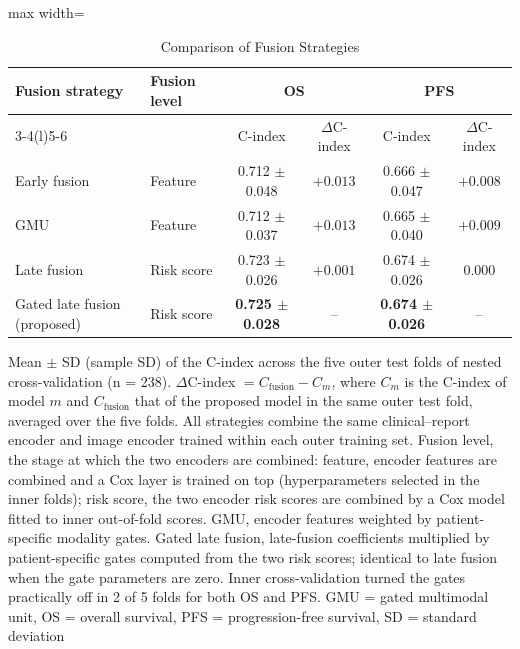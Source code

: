 \begin{table}[htbp]
\centering
\setlength{\belowcaptionskip}{4pt}
\caption{Comparison of Fusion Strategies}
\label{tab:fusion}
\small\setlength{\tabcolsep}{4pt}
\begin{adjustbox}{max width=\textwidth}
\begin{tabular}{@{}ll cc cc@{}}
\toprule
Fusion strategy & Fusion level & \multicolumn{2}{c}{OS} & \multicolumn{2}{c}{PFS} \\
\cmidrule(lr){3-4}\cmidrule(l){5-6}
 & & C-index & $\Delta$C-index & C-index & $\Delta$C-index \\
\midrule
Early fusion & Feature & 0.712 $\pm$ 0.048 & $+0.013$ & 0.666 $\pm$ 0.047 & $+0.008$ \\
GMU & Feature & 0.712 $\pm$ 0.037 & $+0.013$ & 0.665 $\pm$ 0.040 & $+0.009$ \\
\addlinespace
Late fusion & Risk score & 0.723 $\pm$ 0.026 & $+0.001$ & 0.674 $\pm$ 0.026 & 0.000 \\
Gated late fusion (proposed) & Risk score & \textbf{0.725 $\pm$ 0.028} & -- & \textbf{0.674 $\pm$ 0.026} & -- \\
\bottomrule
\end{tabular}%
\end{adjustbox}
\par\smallskip
\begin{minipage}{\textwidth}\footnotesize
Mean $\pm$ SD (sample SD) of the C-index across the five outer test folds of nested cross-validation (n = 238). $\Delta$C-index $= C_{\mathrm{fusion}} - C_{m}$, where $C_{m}$ is the C-index of model $m$ and $C_{\mathrm{fusion}}$ that of the proposed model in the same outer test fold, averaged over the five folds. All strategies combine the same clinical--report encoder and image encoder trained within each outer training set. Fusion level, the stage at which the two encoders are combined: feature, encoder features are combined and a Cox layer is trained on top (hyperparameters selected in the inner folds); risk score, the two encoder risk scores are combined by a Cox model fitted to inner out-of-fold scores. GMU, encoder features weighted by patient-specific modality gates. Gated late fusion, late-fusion coefficients multiplied by patient-specific gates computed from the two risk scores; identical to late fusion when the gate parameters are zero. Inner cross-validation turned the gates practically off in 2 of 5 folds for both OS and PFS. GMU = gated multimodal unit, OS = overall survival, PFS = progression-free survival, SD = standard deviation
\end{minipage}
\end{table}

